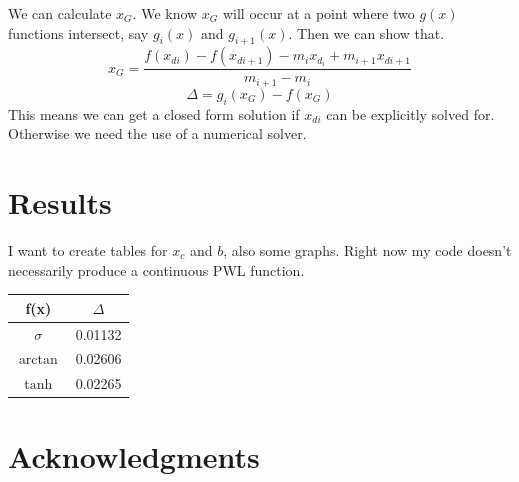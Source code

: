 \documentclass[a4paper,10pt,preprint,3p,hidelinks]{elsarticle}
\begin{document}
	We can calculate $x_G$. We know $x_G$ will occur at a point where two $g(x)$ functions intersect, say $g_i(x)$ and $g_{i+1}(x)$. Then we can show that.
	\[x_G=\frac{f(x_{di}) - f(x_{di+1}) - m_ix_{d_i} + m_{i+1}x_{di+1}}{m_{i+1} - m_{i}}\]
	\[\Delta = g_i(x_G) - f(x_G)\]
	This means we can get a closed form solution if $x_{di}$ can be explicitly solved for. Otherwise we need the use of a numerical solver.
	
	\section{Results}
	I want to create tables for $x_c$ and $b$, also some graphs. Right now my code doesn't necessarily produce a continuous PWL function.
	
	\begin{center}
		\begin{tabular}{|c c|} 
			\hline
			f(x) & $\Delta$ \\
			\hline\hline
			$\sigma$ & 0.01132\\
			\hline
			$\arctan$ & 0.02606 \\
			\hline
			$\tanh$ & 0.02265 \\
			\hline
		\end{tabular}
	\end{center}
	\section*{Acknowledgments}
	

	
	\FloatBarrier
	
	
\end{document}
